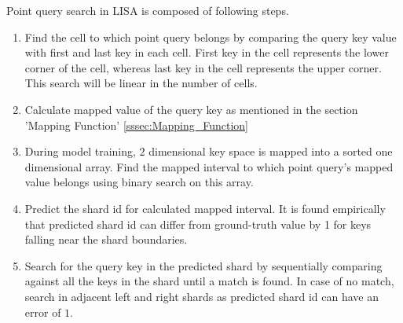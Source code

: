 Point query search in LISA is composed of following steps.

\begin{enumerate}
	\item Find the cell to which point query belongs by comparing the query key value with first and last key in each cell. First key in the cell represents the lower corner of the cell, whereas last key in the cell represents the upper corner. This search will be linear in the number of cells.
	\item Calculate mapped value of the query key as mentioned in the section 'Mapping Function' \ref{sssec:Mapping_Function}
	\item During model training, $2$ dimensional key space is mapped into a sorted one dimensional array. Find the mapped interval to which point query's mapped value belongs using binary search on this array.  
	\item Predict the shard id for calculated mapped interval. It is found empirically that predicted shard id can differ from ground-truth value by 1 for keys falling near the shard boundaries. 
	\item Search for the query key in the predicted shard by sequentially comparing against all the keys in the shard until a match is found. In case of no match, search in adjacent left and right shards as predicted shard id can have an error of $1$. 
\end{enumerate}